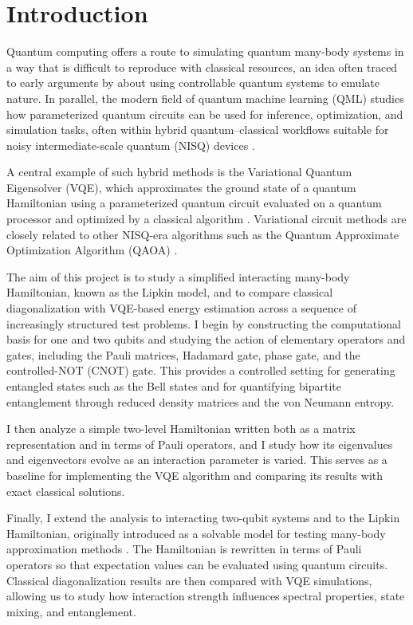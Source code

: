 \section{Introduction}\label{section:Introduction}

Quantum computing offers a route to simulating quantum many-body systems in a way that is difficult to reproduce with classical resources, an idea often traced to early arguments by \textcite{feynman1982simulating} about using controllable quantum systems to emulate nature. In parallel, the modern field of quantum machine learning (QML) studies how parameterized quantum circuits can be used for inference, optimization, and simulation tasks, often within hybrid quantum--classical workflows suitable for noisy intermediate-scale quantum (NISQ) devices \parencite{schuld2018supervised,schuld2021mlqc,carleo2017nqs,carleo2019mlphys}. 

A central example of such hybrid methods is the Variational Quantum Eigensolver (VQE), which approximates the ground state of a quantum Hamiltonian using a parameterized quantum circuit evaluated on a quantum processor and optimized by a classical algorithm \parencite{peruzzo2014vqe,mcclean2016theory,tilly2022vqe_review}. Variational circuit methods are closely related to other NISQ-era algorithms such as the Quantum Approximate Optimization Algorithm (QAOA) \parencite{farhi2014qaoa,zhou2019qaoa}.

The aim of this project is to study a simplified interacting many-body Hamiltonian, known as the Lipkin model, and to compare classical diagonalization with VQE-based energy estimation across a sequence of increasingly structured test problems. I begin by constructing the computational basis for one and two qubits and studying the action of elementary operators and gates, including the Pauli matrices, Hadamard gate, phase gate, and the controlled-NOT (CNOT) gate. This provides a controlled setting for generating entangled states such as the Bell states and for quantifying bipartite entanglement through reduced density matrices and the von Neumann entropy.

I then analyze a simple two-level Hamiltonian written both as a matrix representation and in terms of Pauli operators, and I study how its eigenvalues and eigenvectors evolve as an interaction parameter is varied. This serves as a baseline for implementing the VQE algorithm and comparing its results with exact classical solutions.

Finally, I extend the analysis to interacting two-qubit systems and to the Lipkin Hamiltonian, originally introduced as a solvable model for testing many-body approximation methods \parencite{lipkin1965}. The Hamiltonian is rewritten in terms of Pauli operators so that expectation values can be evaluated using quantum circuits. Classical diagonalization results are then compared with VQE simulations, allowing us to study how interaction strength influences spectral properties, state mixing, and entanglement.


